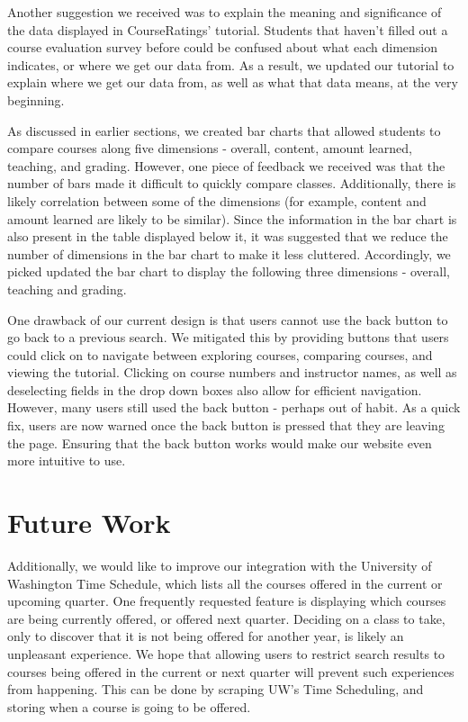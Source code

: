 \documentclass{chi2009}
\begin{document}
Another suggestion we received was to explain the meaning and significance of the data displayed in CourseRatings' tutorial. Students that haven't filled out a course evaluation survey before could be confused about what each dimension indicates, or where we get our data from. As a result, we updated our tutorial to explain where we get our data from, as well as what that data means, at the very beginning.

As discussed in earlier sections, we created bar charts that allowed students to compare courses along five dimensions - overall, content, amount learned, teaching, and grading. However, one piece of feedback we received was that the number of bars made it difficult to quickly compare classes. Additionally, there is likely correlation between some of the dimensions (for example, content and amount learned are likely to be similar). Since the information in the bar chart is also present in the table displayed below it, it was suggested that we reduce the number of dimensions in the bar chart to make it less cluttered. Accordingly, we picked updated the bar chart to display the following three dimensions - overall, teaching and grading.

One drawback of our current design is that users cannot use the back button to go back to a previous search. We mitigated this by providing buttons that users could click on to navigate between exploring courses, comparing courses, and viewing the tutorial. Clicking on course numbers and instructor names, as well as deselecting fields in the drop down boxes also allow for efficient navigation. However, many users still used the back button - perhaps out of habit. As a quick fix, users are now warned once the back button is pressed that they are leaving the page. Ensuring that the back button works would make our website even more intuitive to use.

\vspace*{-5 pt}
\section{Future Work}
Additionally, we would like to improve our integration with the University of Washington Time Schedule, which lists all the courses offered in the current or upcoming quarter. One frequently requested feature is displaying which courses are being currently offered, or offered next quarter. Deciding on a class to take, only to discover that it is not being offered for another year, is likely an unpleasant experience. We hope that allowing users to restrict search results to courses being offered in the current or next quarter will prevent such experiences from happening. This can be done by scraping UW’s Time Scheduling, and storing when a course is going to be offered.
\end{document}

